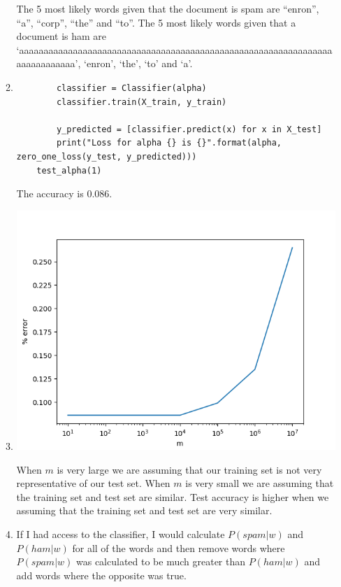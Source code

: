 \begin{enumerate}
\begin{enumerate}
  		The 5 most likely words given that the document is spam are ``enron'', ``a'', ``corp'', ``the'' and ``to''. The 5 most likely words given that a document is ham are `aaaaaaaaaaaaaaaaaaaaaaaaaaaaaaaaaaaaaaaaaaaaaaaaaaaaaaaaaaaaaaaaaaaaaaaaaaaa', `enron', `the', `to' and `a'.
  	\item 
  	\begin{verbatim}
	    classifier = Classifier(alpha)
	    classifier.train(X_train, y_train)

	    y_predicted = [classifier.predict(x) for x in X_test]
	    print("Loss for alpha {} is {}".format(alpha, zero_one_loss(y_test, y_predicted)))
	test_alpha(1)
	\end{verbatim}

  	The accuracy is 0.086.
  	\item 

  	\includegraphics{error_plot.png}

  	When $m$ is very large we are assuming that our training set is not very representative of our test set. When $m$ is very small we are assuming that the training set and test set are similar. Test accuracy is higher when we assuming that the training set and test set are very similar.

  	\item If I had access to the classifier, I would calculate $P(spam|w)$ and $P(ham|w)$ for all of the words and then remove words where $P(spam|w)$ was calculated to be much greater than $P(ham|w)$ and add words where the opposite was true.

  \end{enumerate}
\end{enumerate}